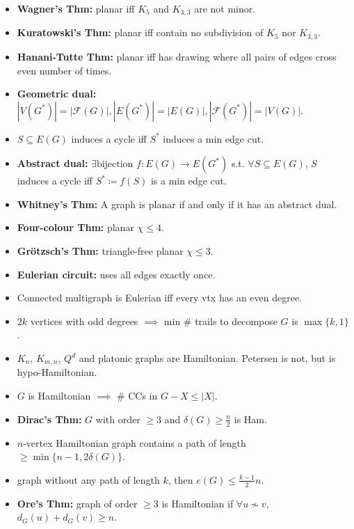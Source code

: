 \documentclass[10pt]{article}
\newcommand{\abs}[1]{\left\lvert#1\right\rvert}
\begin{document}
\begin{multicols*}{3}
\begin{itemize}
\begin{enumerate}
            \end{enumerate}
            \item \textbf{Wagner's Thm:} planar iff $K_5$ and $K_{3, 3}$ are not minor.
            \item \textbf{Kuratowski's Thm:} planar iff contain no subdivision of $K_5$ nor $K_{3, 3}$.
            \item \textbf{Hanani-Tutte Thm:} planar iff has drawing where all pairs of edges cross even number of times.
            \item \textbf{Geometric dual:} $\abs{V(G^*)} = \abs{\mathcal{F}(G)}, \abs{E(G^*)} = \abs{E(G)}, \abs{\mathcal{F}(G^*)} = \abs{V(G)}$.
            \item $S \subseteq E(G)$ induces a cycle iff $S^*$ induces a min edge cut.
            \item \textbf{Abstract dual:} $\exists \textrm{bijection } f \colon E(G) \to E(G^*)$ s.t. $\forall S \subseteq E(G)$, $S$ induces a cycle iff $S^* \coloneqq f(S)$ is a min edge cut.
            \item \textbf{Whitney's Thm:} A graph is planar if and only if it has an abstract dual.
            \item \textbf{Four-colour Thm:} planar $\chi \leq 4$.
            \item \textbf{Gr\"{o}tzsch's Thm:} triangle-free planar $\chi \leq 3$.
            \item \textbf{Eulerian circuit:} uses all edges exactly once.
            \item Connected multigraph is Eulerian iff every vtx has an even degree.
            \item $2k$ vertices with odd degrees $\implies$ min \# trails to decompose $G$ is $\max\{k, 1\}$.
            \item $K_n$, $K_{m, n}$, $Q^d$ and platonic graphs are Hamiltonian. Petersen is not, but is hypo-Hamiltonian.
            \item $G$ is Hamiltonian $\implies$ \# CCs in $G - X \leq \abs{X}$.
            \item \textbf{Dirac's Thm:} $G$ with order $\geq 3$ and $\delta(G) \geq \frac{n}{2}$ is Ham.
            \item $n$-vertex Hamiltonian graph contains a path of length $\geq \min\{n - 1, 2\delta(G)\}$.
            \item graph without any path of length $k$, then $e(G) \leq \frac{k - 1}{2}n$.
            \item \textbf{Ore's Thm:} graph of order $\geq 3$ is Hamiltonian if $\forall u \not\sim v$, $d_G(u) + d_G(v) \geq n$.

\end{itemize}
\end{multicols*}
\end{document}
